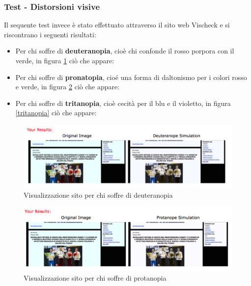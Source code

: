 	\subsubsection {Test - Distorsioni visive}
	Il sequente test invece \`e  stato effettuato attraverso il sito web Vischeck e si riscontrano i seguenti risultati:
	\begin{itemize}
	\item Per chi soffre di \textbf{deuteranopia}, cio\`e chi confonde il rosso porpora con il verde, in figura \ref{deuteranopia} ci\`o che appare:
	
	\item Per chi soffre di \textbf{pronatopia}, cio\'e una forma di daltonismo per i colori rosso e verde,  in figura \ref{protanopia} ci\`o che appare:
	
	\item Per chi soffre di \textbf{tritanopia}, cio\`e cecit\`a per il blu e il violetto, in figura \ref{tritanopia} ci\`o che appare:
	\end{itemize}
	
	\begin{figure}[h!]
		\centering
		\includegraphics[scale=0.4]{images/contrasto_pagina_deuteranope.png}
		\caption{Visualizzazione sito per chi soffre di deuteranopia}
		\label{deuteranopia}
	\end{figure}	
	
	\begin{figure}[h!]
		\centering
		\includegraphics[scale=0.4]{images/contrasto_pagina_protanope.png}
		\caption{Visualizzazione sito per chi soffre di protanopia}
		\label{protanopia}
	\end{figure}
	

